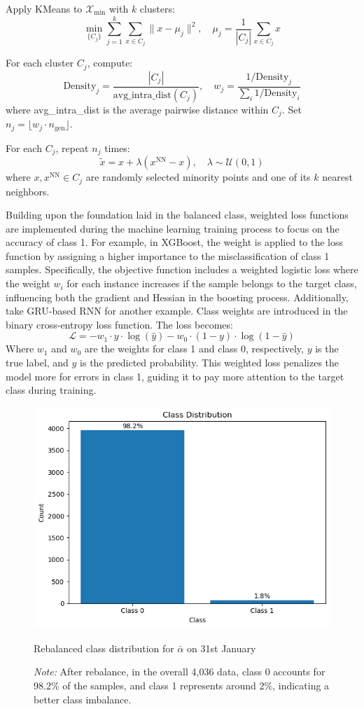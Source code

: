 Apply KMeans to $\mathcal{X}_{\text{min}}$ with $k$ clusters:
  \[
  \min_{\{C_j\}} \sum_{j=1}^k \sum_{x \in C_j} \|x - \mu_j\|^2, \quad \mu_j = \frac{1}{|C_j|} \sum_{x \in C_j} x
  \]

For each cluster $C_j$, compute:
  \[
  \text{Density}_j = \frac{|C_j|}{\text{avg\_intra\_dist}(C_j)}, \quad w_j = \frac{1/\text{Density}_j}{\sum_{i} 1/\text{Density}_i}
  \]
where avg\_intra\_dist is the average pairwise distance within $C_j$. Set $n_j = \lfloor w_j \cdot n_{\text{gen}} \rfloor$.

For each $C_j$, repeat $n_j$ times:
  \[
  \tilde{x} = x + \lambda (x^{\text{NN}} - x), \quad \lambda \sim \mathcal{U}(0, 1)
  \]
where $x, x^{\text{NN}} \in C_j$ are randomly selected minority points and one of its $k$ nearest neighbors.

Building upon the foundation laid in the balanced class, weighted loss functions are implemented during the machine learning training process to focus on the accuracy of class 1. For example, in XGBoost, the weight is applied to the loss function by assigning a higher importance to the misclassification of class 1 samples. Specifically, the objective function includes a weighted logistic loss where the weight $w_i$ for each instance increases if the sample belongs to the target class, influencing both the gradient and Hessian in the boosting process. Additionally, take GRU-based RNN for another example. Class weights are introduced in the binary cross-entropy loss function. The loss becomes:
\[
\mathcal{L} = -w_1 \cdot y \cdot \log(\hat{y}) - w_0 \cdot (1 - y) \cdot \log(1 - \hat{y})
\]
Where $w_1$ and $w_0$ are the weights for class 1 and class 0, respectively, $y$ is the true label, and $\hat{y}$ is the predicted probability. This weighted loss penalizes the model more for errors in class 1, guiding it to pay more attention to the target class during training.

\begin{figure}[h]
    \centering
    \includegraphics[width=0.8\linewidth]{figures/NHP_distribution.png}
    \caption{Rebalanced class distribution for $\bar{\alpha}$ on 31st January}
    \caption*{\textit{Note:} After rebalance, in the overall 4,036 data, class 0 accounts for 98.2\% of the samples, and class 1 represents around 2\%, indicating a better class imbalance.}
    \label{fig: aflag_better_class_distribution}
\end{figure}


